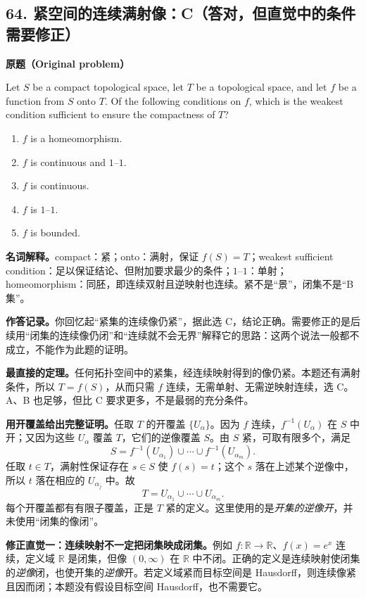 \documentclass[11pt,a4paper,fontset=fandol]{ctexart}
\begin{document}
\subsection{64. 紧空间的连续满射像：C（答对，但直觉中的条件需要修正）}
\label{p4:q64}
\textbf{原题（Original problem）}

Let $S$ be a compact topological space, let $T$ be a topological space, and let $f$ be a function from $S$ onto $T$. Of the following conditions on $f$, which is the weakest condition sufficient to ensure the compactness of $T$?
\begin{enumerate}[label=(\Alph*)]
\item $f$ is a homeomorphism.
\item $f$ is continuous and $1$--$1$.
\item $f$ is continuous.
\item $f$ is $1$--$1$.
\item $f$ is bounded.
\end{enumerate}
\textbf{名词解释。}compact：紧；onto：满射，保证 $f(S)=T$；weakest sufficient condition：足以保证结论、但附加要求最少的条件；$1$--$1$：单射；homeomorphism：同胚，即连续双射且逆映射也连续。紧不是“景”，闭集不是“B 集”。

\textbf{作答记录。}你回忆起“紧集的连续像仍紧”，据此选 C，结论正确。需要修正的是后续用“闭集的连续像仍闭”和“连续就不会无界”解释它的思路：这两个说法一般都不成立，不能作为此题的证明。

\textbf{最直接的定理。}任何拓扑空间中的紧集，经连续映射得到的像仍紧。本题还有满射条件，所以 $T=f(S)$，从而只需 $f$ 连续，无需单射、无需逆映射连续，选 C。A、B 也足够，但比 C 要求更多，不是最弱的充分条件。

\textbf{用开覆盖给出完整证明。}任取 $T$ 的开覆盖 $\{U_\alpha\}$。因为 $f$ 连续，$f^{-1}(U_\alpha)$ 在 $S$ 中开；又因为这些 $U_\alpha$ 覆盖 $T$，它们的逆像覆盖 $S$。由 $S$ 紧，可取有限多个，满足
\[
S=f^{-1}(U_{\alpha_1})\cup\cdots\cup f^{-1}(U_{\alpha_m}).
\]
任取 $t\in T$，满射性保证存在 $s\in S$ 使 $f(s)=t$；这个 $s$ 落在上述某个逆像中，所以 $t$ 落在相应的 $U_{\alpha_j}$ 中。故
\[
T=U_{\alpha_1}\cup\cdots\cup U_{\alpha_m}.
\]
每个开覆盖都有有限子覆盖，正是 $T$ 紧的定义。这里使用的是\emph{开集的逆像开}，并未使用“闭集的像闭”。

\textbf{修正直觉一：连续映射不一定把闭集映成闭集。}例如 $f:\mathbb R\to\mathbb R$、$f(x)=e^x$ 连续，定义域 $\mathbb R$ 是闭集，但像 $(0,\infty)$ 在 $\mathbb R$ 中不闭。正确的定义是连续映射使闭集的\emph{逆像}闭，也使开集的\emph{逆像}开。若定义域紧而目标空间是 Hausdorff，则连续像紧且因而闭；本题没有假设目标空间 Hausdorff，也不需要它。
\end{document}
